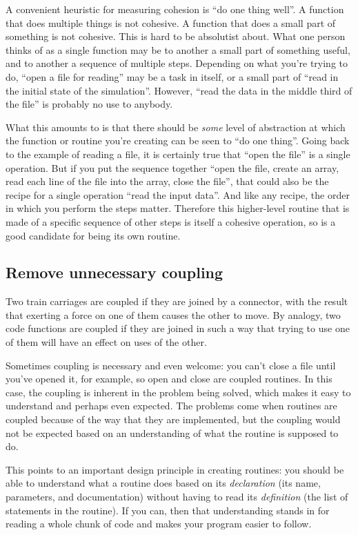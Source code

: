 \documentclass[a4paper]{article}
\begin{document}
A convenient heuristic for measuring cohesion is ``do one thing well''.
A function that does multiple things is not cohesive.
A function that does a small part of something is not cohesive.
This is hard to be absolutist about.
What one person thinks of as a single function may be to another a small part of something useful, and to another a sequence of multiple steps.
Depending on what you're trying to do, ``open a file for reading'' may be a task in itself, or a small part of ``read in the initial state of the simulation''.
However, ``read the data in the middle third of the file'' is probably no use to anybody.

What this amounts to is that there should be \textit{some} level of abstraction at which the function or routine you're creating can be seen to ``do one thing''.
Going back to the example of reading a file, it is certainly true that ``open the file'' is a single operation.
But if you put the sequence together ``open the file, create an array, read each line of the file into the array, close the file'', that could also be the recipe for a single operation ``read the input data''.
And like any recipe, the order in which you perform the steps matter.
Therefore this higher-level routine that is made of a specific sequence of other steps is itself a cohesive operation, so is a good candidate for being its own routine.

\subsection {Remove unnecessary coupling}

Two train carriages are coupled if they are joined by a connector, with the result that exerting a force on one of them causes the other to move.
By analogy, two code functions are coupled if they are joined in such a way that trying to use one of them will have an effect on uses of the other.

Sometimes coupling is necessary and even welcome: you can't close a file until you've opened it, for example, so open and close are coupled routines.
In this case, the coupling is inherent in the problem being solved, which makes it easy to understand and perhaps even expected.
The problems come when routines are coupled because of the way that they are implemented, but the coupling would not be expected based on an understanding of what the routine is supposed to do.

This points to an important design principle in creating routines: you should be able to understand what a routine does based on its \textit{declaration} (its name, parameters, and documentation) without having to read its \textit{definition} (the list of statements in the routine).
If you can, then that understanding stands in for reading a whole chunk of code and makes your program easier to follow.
\end{document}
